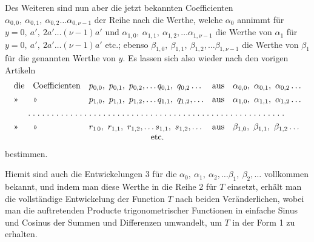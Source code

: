 \begin{landscape}
\par\noindent\hspace*{\parindent}Des Weiteren sind nun aber die jetzt bekannten Coefficienten \(\alpha_{0,0},\ \alpha_{0,1},\ \alpha_{0,2}\ldots\alpha_{0,\nu-1}\) der Reihe nach die Werthe, welche \(\alpha_0\) annimmt für \(y=0,\ a',\ 2a'\ldots(\nu-1)a'\) und \(\alpha_{1,0},\ \alpha_{1,1},\ \alpha_{1,2},\ldots\alpha_{1,\nu-1}\) die Werthe von \(\alpha_1\) für \(y=0,\ a',\ 2a'\ldots(\nu-1)a'\) etc.; ebenso \(\beta_{1,0},\ \beta_{1,1},\ \beta_{1,2},\ldots\beta_{1,\nu-1}\) die Werthe von \(\beta_1\) für die genannten Werthe von \(y\). Es lassen sich also wieder nach den vorigen Artikeln
\[
\begin{array}{@{}ll@{\quad}l@{\quad}l@{\quad}l@{}}
\text{die}&\text{Coefficienten}&p_{0,0},\ p_{0,1},\ p_{0,2},\ldots q_{0,1},\ q_{0,2}\ldots&\text{aus}&\alpha_{0,0},\ \alpha_{0,1},\ \alpha_{0,2}\ldots\\[4pt]
\text{»}&\text{»}&p_{1,0},\ p_{1,1},\ p_{1,2},\ldots q_{1,1},\ q_{1,2},\ldots&\text{aus}&\alpha_{1,0},\ \alpha_{1,1},\ \alpha_{1,2}\ldots\\[4pt]
\multicolumn{5}{@{}c@{}}{\VFiveTenPoints\VFiveTenPoints\VFiveTenPoints\VFiveTenPoints\VFiveTenPoints\VFivePoint\VFivePoint\VFivePoint\VFivePoint\VFivePoint}\\[4pt]
\text{»}&\text{»}&r_{1\,0},\ r_{1,1},\ r_{1,2},\ldots s_{1,1},\ s_{1,2},\ldots&\text{aus}&\beta_{1,0},\ \beta_{1,1},\ \beta_{1,2}\ldots\\
\multicolumn{5}{c}{\text{etc.}}
\end{array}
\]
bestimmen.

\par\noindent\hspace*{\parindent}Hiemit sind auch die Entwickelungen 3 für die \(\alpha_0,\ \alpha_1,\ \alpha_2,\ldots\beta_1,\ \beta_2,\ldots\) vollkommen bekannt, und indem man diese Werthe in die Reihe 2 für \(T\) einsetzt, erhält man die vollständige Entwickelung der Function \(T\) nach beiden Veränderlichen, wobei man die auftretenden Producte trigonometrischer Functionen in einfache Sinus und Cosinus der Summen und Differenzen umwandelt, um \(T\) in der Form 1 zu erhalten.


\end{landscape}
